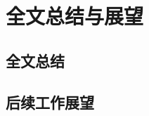 \documentclass{standalone}
\begin{document}
	
\chapter{全文总结与展望}
\section{全文总结}
\section{后续工作展望}
\end{document}
